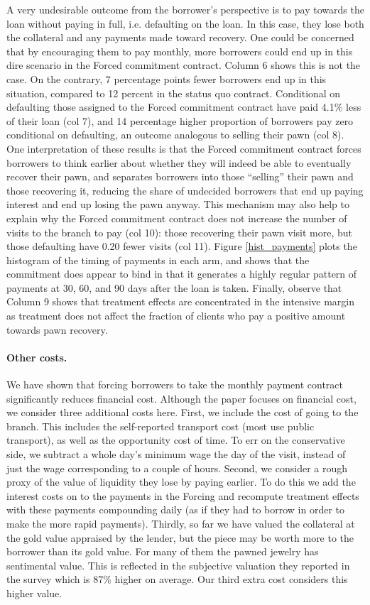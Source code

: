 \documentclass[oneside,11pt]{article}
\begin{document}
A very undesirable outcome from the borrower's perspective is to pay towards the loan without paying in full, i.e. defaulting on the loan. In this case, they lose both the collateral and any payments made toward recovery. One could be concerned that by encouraging them to pay monthly, more borrowers could end up in this dire scenario in the Forced commitment contract. Column 6 shows this is not the case. On the contrary,  7 percentage points fewer borrowers end up in this situation, compared to 12 percent in the status quo contract. Conditional on defaulting those assigned to the Forced commitment contract have paid 4.1\% less of their loan (col 7), and 14 percentage higher proportion of borrowers pay zero conditional on defaulting, an outcome analogous to selling their pawn (col 8). One interpretation of these results is that the Forced commitment contract forces borrowers to think earlier about whether they will indeed be able to eventually recover their pawn, and separates borrowers into those ``selling'' their pawn and those recovering it, reducing the share of undecided borrowers that end up paying interest and end up losing the pawn anyway. This mechanism may also help to explain why the Forced commitment contract does not increase the number of visits to the branch to pay (col 10): those recovering their pawn visit more, but those defaulting have 0.20 fewer visits (col 11). Figure \ref{hist_payments} plots the histogram of the timing of payments in each arm, and shows that the commitment does appear to bind in that it generates a highly regular pattern of payments at 30, 60, and 90 days after the loan is taken. Finally, observe that Column 9 shows that treatment effects are concentrated in the intensive margin as treatment does not affect the fraction of clients who pay a positive amount towards pawn recovery.

\paragraph{Other costs.} We have shown that forcing borrowers to take the monthly payment contract significantly reduces financial cost. Although the paper focuses on financial cost, we consider three additional costs here. First, we include the cost of going to the branch. This includes the self-reported transport cost (most use public transport), as well as the opportunity cost of time. To err on the conservative side, we subtract a whole day's minimum wage the day of the visit, instead of just the wage corresponding to a couple of hours. Second, we consider a rough proxy of the value of liquidity they lose by paying earlier. To do this we add the interest costs on to the payments in the Forcing and recompute treatment effects with these payments compounding daily (as if they had to borrow in order to make the more rapid payments). Thirdly, so far we have valued the collateral at the gold value appraised by the lender, but the piece may be worth more to the borrower than its gold value.  For many of them the pawned jewelry has sentimental value. This is reflected in the subjective valuation they reported in the survey which is 87\% higher on average. Our third extra cost considers this higher value.
\end{document}
